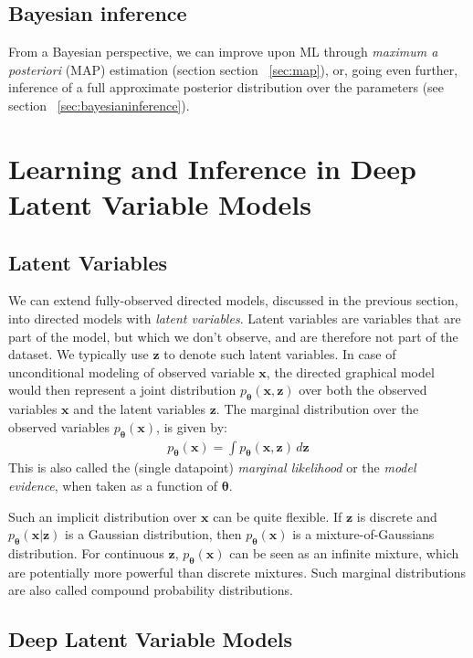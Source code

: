 \documentclass[MAL,biber]{nowfnt} %
\newcommand{\bb}[1]{\mathbf{#1}}
\newcommand{\bx}{\bb{x}}
\newcommand{\bz}{\bb{z}}
\newcommand{\bT}{\boldsymbol{\theta}}
\newcommand{\pT}{p_{\bT}}
\begin{document}
\subsection{Bayesian inference}

From a Bayesian perspective, we can improve upon ML through \emph{maximum a posteriori} (MAP) estimation (section section ~\ref{sec:map}), or, going even further, inference of a full approximate posterior distribution over the parameters (see section ~\ref{sec:bayesianinference}). 

\section{Learning and Inference in Deep Latent Variable Models}

\subsection{Latent Variables}
\label{sec:latentvariables}

We can extend fully-observed directed models, discussed in the previous section, into directed models with \emph{latent variables}. Latent variables are variables that are part of the model, but which we don't observe, and are therefore not part of the dataset. We typically use $\bz$ to denote such latent variables. In case of unconditional modeling of observed variable $\bx$, the directed graphical model would then represent a joint distribution $\pT(\bx, \bz)$ over both the observed variables $\bx$ and the latent variables $\bz$. The marginal distribution over the observed variables $\pT(\bx)$, is given by:
\begin{align}
\pT(\bx) = \int \pT(\bx,\bz) \,d\bz
\label{eq:marginal}
\end{align}
This is also called the (single datapoint) \emph{marginal likelihood} or the \emph{model evidence}, when taken as a function of $\bT$.

Such an implicit distribution over $\bx$ can be quite flexible. If $\bz$ is discrete and $\pT(\bx|\bz)$ is a Gaussian distribution, then $\pT(\bx)$ is a mixture-of-Gaussians distribution. For continuous $\bz$, $\pT(\bx)$ can be seen as an infinite mixture, which are potentially more powerful than discrete mixtures. Such marginal distributions are also called compound probability distributions.

\subsection{Deep Latent Variable Models}
\label{sec:dlvms}
\end{document}
